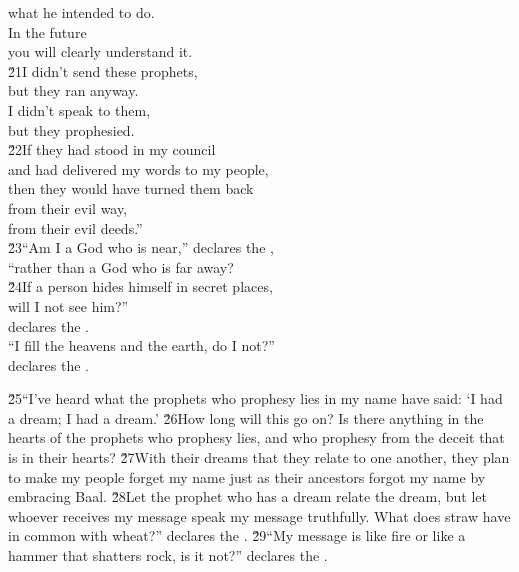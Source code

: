 \begin{poetry}
\poemlll       what he intended to do. \\
\poeml In the future \\
\poemll    you will clearly understand it. \\
\poeml \v{21}I didn't send these prophets, \\
\poemll    but they ran anyway. \\
\poeml I didn't speak to them, \\
\poemll    but they prophesied. \\
\poeml \v{22}If they had stood in my council \\
\poemll    and had delivered my words to my people, \\
\poeml then they would have turned them back \\
\poemll    from their evil way, \\
\poemlll       from their evil deeds.'' \\
\poeml \v{23}``Am I a God who is near,'' declares the , \\
\poemll    ``rather than a God who is far away? \\
\poeml \v{24}If a person hides himself in secret places, \\
\poemll    will I not see him?'' \\
\poemlll       declares the . \\
\poeml ``I fill the heavens and the earth, do I not?'' \\
\poemll    declares the .
\end{poetry}

\v{25}``I've heard what the prophets who prophesy lies in my name have said: `I had a dream; I had a dream.' \v{26}How long will this go on? Is there anything in the hearts of the prophets who prophesy lies, and who prophesy from the deceit that is in their hearts? \v{27}With their dreams that they relate to one another, they plan to make my people forget my name just as their ancestors forgot my name by embracing Baal. \v{28}Let the prophet who has a dream relate the dream, but let whoever receives my message speak my message truthfully. What does straw have in common with wheat?'' declares the . \v{29}``My message is like fire or like a hammer that shatters rock, is it not?'' declares the .

